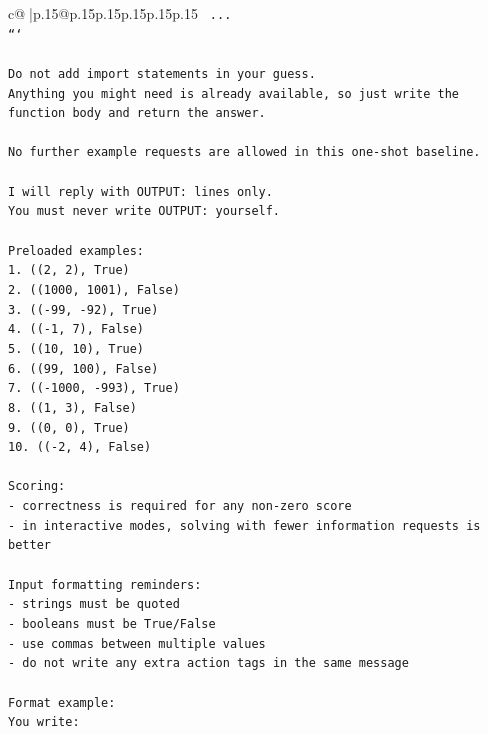 \documentclass{article}
\begin{document}
{\begin{supertabular}{c@{$\;$}|p{.15\linewidth}@{}p{.15\linewidth}p{.15\linewidth}p{.15\linewidth}p{.15\linewidth}p{.15\linewidth}}
{{{\texttt{    ...} \\
\texttt{```} \\
\\ 
\texttt{Do not add import statements in your guess.} \\
\texttt{Anything you might need is already available, so just write the function body and return the answer.} \\
\\ 
\texttt{No further example requests are allowed in this one{-}shot baseline.} \\
\\ 
\texttt{I will reply with OUTPUT: lines only.} \\
\texttt{You must never write OUTPUT: yourself.} \\
\\ 
\texttt{Preloaded examples:} \\
\texttt{1. ((2, 2), True)} \\
\texttt{2. ((1000, 1001), False)} \\
\texttt{3. (({-}99, {-}92), True)} \\
\texttt{4. (({-}1, 7), False)} \\
\texttt{5. ((10, 10), True)} \\
\texttt{6. ((99, 100), False)} \\
\texttt{7. (({-}1000, {-}993), True)} \\
\texttt{8. ((1, 3), False)} \\
\texttt{9. ((0, 0), True)} \\
\texttt{10. (({-}2, 4), False)} \\
\\ 
\texttt{Scoring:} \\
\texttt{{-} correctness is required for any non{-}zero score} \\
\texttt{{-} in interactive modes, solving with fewer information requests is better} \\
\\ 
\texttt{Input formatting reminders:} \\
\texttt{{-} strings must be quoted} \\
\texttt{{-} booleans must be True/False} \\
\texttt{{-} use commas between multiple values} \\
\texttt{{-} do not write any extra action tags in the same message} \\
\\ 
\texttt{Format example:} \\
\texttt{You write:} \\
}}}
\end{supertabular}}
\end{document}
